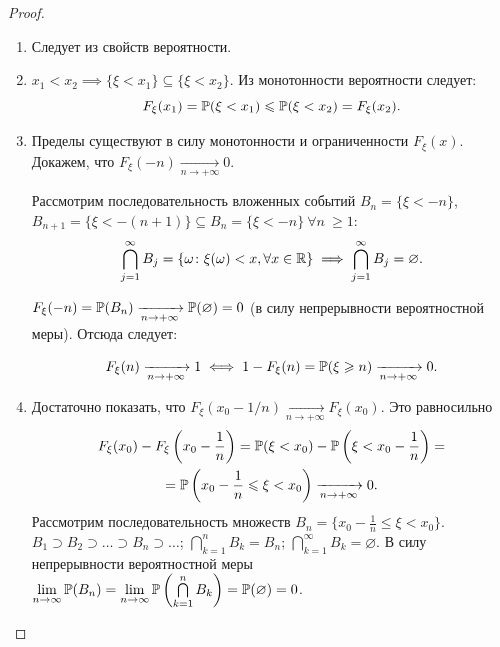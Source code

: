 \begin{proof}
\begin{enumerate}
    \item 
        Следует из свойств вероятности.
    \item 
        $x_1 < x_2 \implies \{\xi < x_1 \} \subseteq \{\xi < x_2\}$. Из монотонности вероятности следует:
        \begin{equation*}
            F_\xi(x_1) = \operatorname{\mathbb{P}}(\xi < x_1) \leqslant \operatorname{\mathbb{P}}(\xi < x_2) = F_\xi(x_2).
        \end{equation*}
    \item 
        Пределы существуют в силу монотонности и ограниченности $F_\xi(x)$. 
        Докажем, что $F_\xi(-n) \xrightarrow[n \to +\infty]{} 0$.
        
        Рассмотрим последовательность вложенных событий 
        $B_n = \{\xi < -n \}$, 
        $B_{n+1} = \{\xi < -(n+1) \} \subseteq B_n = \{\xi < -n \} ~ \forall n ~ \geqslant 1$:
        \begin{equation*}
            \bigcap\limits_{j = 1}^{\infty}B_j = \{\omega \colon \xi(\omega) < x, \forall x \in \mathbb{R} \} \implies \bigcap\limits_{j = 1}^{\infty}B_j = \varnothing.
        \end{equation*}
    
        $F_\xi(-n) = \operatorname{\mathbb{P}}(B_n) \xrightarrow[n \to +\infty]{} \operatorname{\mathbb{P}}(\varnothing) = 0$ (в силу непрерывности вероятностной меры). Отсюда следует:
        
        \begin{equation*}
            F_\xi(n) \xrightarrow[n \to +\infty]{} 1 \iff 1 - F_\xi(n) = \operatorname{\mathbb{P}}(\xi \geqslant n) \xrightarrow[n \to +\infty]{} 0.
        \end{equation*}
        
    \item
        Достаточно показать, что $F_\xi(x_0 - 1/n) \xrightarrow[n \to +\infty]{} F_\xi(x_0)$. 
        Это равносильно 
        \begin{multline*}
            F_\xi(x_0) - F_\xi \left(x_0 - \frac{1}{n} \right) 
            = \operatorname{\mathbb{P}}(\xi < x_0) - \operatorname{\mathbb{P}}\left( \xi < x_0 - \frac{1}{n} \right) = \\ 
            = \operatorname{\mathbb{P}}\left( x_0 - \frac{1}{n} \leqslant \xi < x_0 \right) \xrightarrow[n \to +\infty]{} 0.
        \end{multline*}
        Рассмотрим последовательность множеств $B_n = \{ x_0 - \frac{1}{n} \leqslant \xi < x_0 \} $. 
        ${B_1 \supset B_2 \supset \ldots \supset B_n \supset \ldots}$;
        $\bigcap\limits_{k=1}^{n}B_k = B_n$;
        $\bigcap\limits_{k=1}^{\infty}B_k = \varnothing$.
        В силу непрерывности вероятностной меры
        $\lim\limits_{n \to \infty} \operatorname{\mathbb{P}}(B_n) =
        \lim\limits_{n \to \infty} \operatorname{\mathbb{P}}\left( \bigcap\limits_{k=1}^{n}B_k \right) =
        \operatorname{\mathbb{P}}(\varnothing) = 0$.
        \qedhere
\end{enumerate}
\end{proof}

